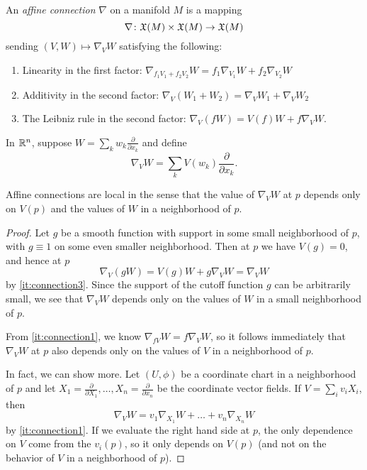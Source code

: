 \begin{definition}\label{def:affine connection}
	An \emph{affine connection} $\nabla$ on a manifold $M$ is a mapping
	\[
		\nabla \colon\thinspace\! \mathfrak{X}(M) \times \mathfrak{X}(M) \to \mathfrak{X}(M)
	\]
	sending $(V,W) \mapsto \nabla_V W$ satisfying the following:
	\begin{enumerate}
		\item \label{it:connection1} Linearity in the first factor: $\nabla_{f_1V_1 + f_2 V_2} W = f_1 \nabla_{V_1}W + f_2 \nabla_{V_2}W$
		\item \label{it:connection2} Additivity in the second factor: $\nabla_V(W_1 + W_2) = \nabla_V W_1 + \nabla_V W_2$
		\item \label{it:connection3} The Leibniz rule in the second factor: $\nabla_V(f W) = V(f) W + f \nabla_V W$.
	\end{enumerate}
\end{definition}

\begin{example}\label{ex:euclidean connection}
	In $\mathbb{R}^n$, suppose $W = \sum_k w_k \frac{\partial}{\partial x_k}$ and define
	\[
		\nabla_V W = \sum_k V(w_k) \frac{\partial}{\partial x_k}.
	\]
\end{example}

\begin{lemma}\label{lem:connection is local}
	Affine connections are local in the sense that the value of $\nabla_V W$ at $p$ depends only on $V(p)$ and the values of $W$ in a neighborhood of $p$.
\end{lemma}

\begin{proof}
	Let $g$ be a smooth function with support in some small neighborhood of $p$, with $g \equiv 1$ on some even smaller neighborhood. Then at $p$ we have $V(g) = 0$, and hence at $p$
	\[
		\nabla_V (g W) = V(g) W + g \nabla_V W = \nabla_V W
	\]
	by \ref{it:connection3}. Since the support of the cutoff function $g$ can be arbitrarily small, we see that $\nabla_V W$ depends only on the values of $W$ in a small neighborhood of $p$.
	
	From \ref{it:connection1}, we know $\nabla_{fV}W = f \nabla_V W$, so it follows immediately that $\nabla_V W$ at $p$ also depends only on the values of $V$ in a neighborhood of $p$.
	
	In fact, we can show more. Let $(U,\phi)$ be a coordinate chart in a neighborhood of $p$ and let $X_1 = \frac{\partial}{\partial X_1}, \dots , X_n = \frac{\partial}{\partial x_n}$ be the coordinate vector fields. If $V = \sum_i v_i X_i$, then
	\[
		\nabla_V W = v_1 \nabla_{X_1} W + \dots + v_n \nabla_{X_n}W
	\]
	by \ref{it:connection1}. If we evaluate the right hand side at $p$, the only dependence on $V$ come from the $v_i(p)$, so it only depends on $V(p)$ (and not on the behavior of $V$ in a neighborhood of $p$).
\end{proof}

